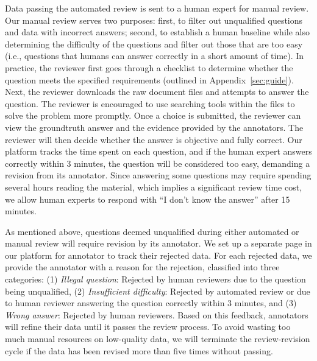 Data passing the automated review is sent to a human expert for manual review. 
Our manual review serves two purposes: first, to filter out unqualified questions and data with incorrect answers; second, to establish a human baseline while also determining the difficulty of the questions and filter out those that are too easy (i.e., questions that humans can answer correctly in a short amount of time).
In practice, the reviewer first goes through a checklist to determine whether the question meets the specified requirements (outlined in Appendix~\ref{sec:guide}). Next, the reviewer downloads the raw document files and attempts to answer the question. The reviewer is encouraged to use searching tools within the files to solve the problem more promptly. Once a choice is submitted, the reviewer can view the groundtruth answer and the evidence provided by the annotators. The reviewer will then decide whether the answer is objective and fully correct. Our platform tracks the time spent on each question, and if the human expert answers correctly within 3 minutes, the question will be considered too easy, demanding a revision from its annotator.
Since answering some questions may require spending several hours reading the material, which implies a significant review time cost, we allow human experts to respond with ``I don't know the answer'' after 15 minutes.

As mentioned above, questions deemed unqualified during either automated or manual review will require revision by its annotator. We set up a separate page in our platform for annotator to track their rejected data. For each rejected data, we provide the annotator with a reason for the rejection, classified into three categories: (1) \emph{Illegal question}: Rejected by human reviewers due to the question being unqualified, (2) \emph{Insufficient difficulty}: Rejected by automated review or due to human reviewer answering the question correctly within 3 minutes, and (3) \emph{Wrong answer}: Rejected by human reviewers. Based on this feedback, annotators will refine their data until it passes the review process. To avoid wasting too much manual resources on low-quality data, we will terminate the review-revision cycle if the data has been revised more than five times without passing.


